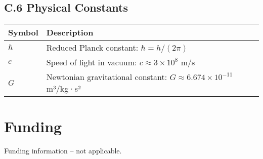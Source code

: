 \documentclass[12pt]{article}
\begin{document}
\vspace{1em}
\subsection*{C.6 Physical Constants}
\begin{longtable}{p{3cm} p{11cm}}
\toprule
\textbf{Symbol} & \textbf{Description} \\
\midrule
$\hbar$ & Reduced Planck constant: $\hbar = h / (2\pi)$ \\
$c$ & Speed of light in vacuum: $c \approx 3 \times 10^8$ m/s \\
$G$ & Newtonian gravitational constant: $G \approx 6.674 \times 10^{-11}$ m³/kg·s² \\
\bottomrule
\end{longtable}

\section*{Funding}
Funding information – not applicable.


\end{document}
